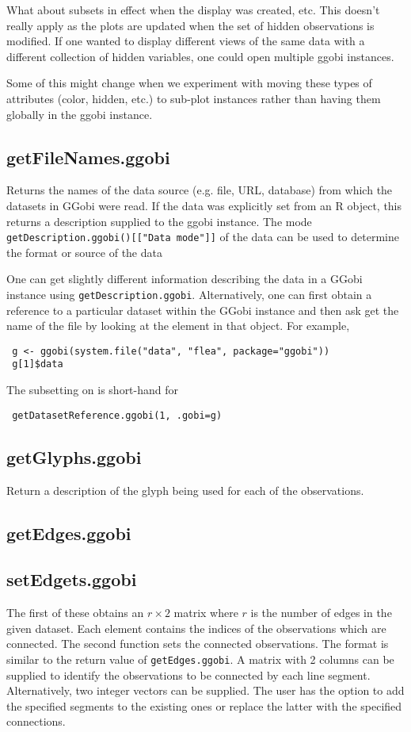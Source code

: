 \documentclass{article}
\def\SFunction#1{{\texttt{\red #1}}}
\begin{document}
What about subsets in effect when the display was created, etc.  This
doesn't really apply as the plots are updated when the set of hidden
observations is modified.  If one wanted to display different views of
the same data with a different collection of hidden variables, one
could open multiple ggobi instances.

Some of this might change when we experiment with moving these types
of attributes (color, hidden, etc.) to sub-plot instances rather than
having them globally in the ggobi instance.

\subsection{getFileNames.ggobi}
Returns the names of the data source (e.g. file, URL, database) from
which the datasets in GGobi were read. If the data was explicitly set
from an R object, this returns a description supplied to the ggobi
instance.  The mode \SFunction{getDescription.ggobi()[["Data mode"]]}
of the data can be used to determine the format or source of the data

One can get slightly different information describing the data in a
GGobi instance using \SFunction{getDescription.ggobi}.  Alternatively,
one can first obtain a reference to a particular dataset within the
GGobi instance and then ask get the name of the file
by looking at the  element in that object.
For example,
\begin{verbatim}
 g <- ggobi(system.file("data", "flea", package="ggobi"))
 g[1]$data     
\end{verbatim}
The subsetting on  
is short-hand for 
\begin{verbatim}
 getDatasetReference.ggobi(1, .gobi=g)
\end{verbatim}%


\subsection{getGlyphs.ggobi}
Return a description of the glyph
being used for each of the observations.


\subsection{getEdges.ggobi}
\subsection{setEdgets.ggobi}
The first of these obtains an $r \times 2$ matrix where $r$ is the
number of edges in the given dataset.  Each element contains
the indices of the observations which are connected.  The second
function sets the connected observations.  The format is similar to
the return value of \SFunction{getEdges.ggobi}.  A matrix with
2 columns can be supplied to identify the observations to be connected
by each line segment.  Alternatively, two integer vectors can be
supplied.  The user has the option to add the specified segments to the
existing ones or replace the latter with the specified connections.
\end{document}
